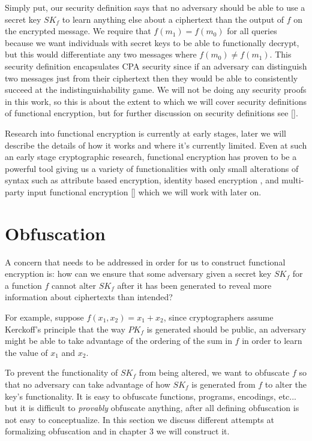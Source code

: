 \documentclass[12pt,twoside]{reedthesis}
\begin{document}
\par Simply put, our security definition says that no adversary should be able to use a secret key $SK_f$ to learn anything else about a ciphertext than the output of $f$ on the encrypted message. We require that $f(m_1)=f(m_0)$ for all queries because we want individuals with secret keys to be able to functionally decrypt, but this would differentiate any two messages where $f(m_0) \not= f(m_1)$. This security definition encapsulates CPA security since if an adversary can distinguish two messages just from their ciphertext then they would be able to consistently succeed at the indistinguishability game. We will not be doing any security proofs in this work, so this is about the extent to which we will cover security definitions of functional encryption, but for further discussion on security definitions see [\cite{funcenc}].

\par Research into functional encryption is currently at early stages, later we will describe the details of how it works and where it's currently limited. Even at such an early stage cryptographic research, functional encryption has proven to be a powerful tool giving us a variety of functionalities with only small alterations of syntax such as attribute based encryption, identity based encryption , and multi-party input functional encryption [\cite{funcenc}] which we will work with later on. 

    
    

    \section{Obfuscation}
    A concern that needs to be addressed in order for us to construct functional encryption is: how can we ensure that some adversary given a secret key $SK_f$ for a function $f$ cannot alter $SK_f$ after it has been generated to reveal more information about ciphertexts than intended? 
    \par For example, suppose $f(x_1,x_2) = x_1 + x_2$, since cryptographers assume Kerckoff's principle that the way $PK_f$ is generated should be public, an adversary might be able to take advantage of the ordering of the sum in $f$ in order to learn the value of $x_1$ and $x_2$.
    \par To prevent the functionality of $SK_f$ from being altered, we want to obfuscate $f$ so that no adversary can take advantage of how $SK_f$ is generated from $f$ to alter the key's functionality. It is easy to obfuscate functions, programs, encodings, etc... but it is difficult to \textit{provably} obfuscate anything, after all defining obfuscation is not easy to conceptualize. In this section we discuss different attempts at formalizing obfuscation and in chapter 3 we will construct it.
    
\end{document}
